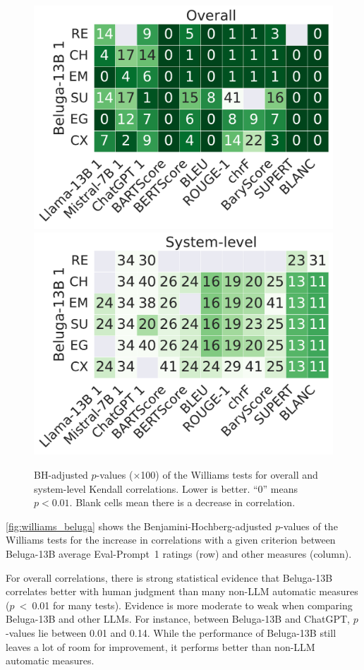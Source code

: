 \begin{figure}[!h]
    \centering
    \includegraphics[width=0.8\columnwidth]{pictures/llm_williams_kendall_story_bh.pdf}
    \includegraphics[width=0.8\columnwidth]{pictures/llm_williams_kendall_system_bh.pdf}
    \caption{BH-adjusted $p$-values ($\times$100) of the Williams tests for overall and system-level Kendall correlations. Lower is better. ``0'' means $p<0.01$. Blank cells mean there is a decrease in correlation.}
    \label{fig:williams_beluga}
\end{figure}

\autoref{fig:williams_beluga} shows the Benjamini-Hochberg-adjusted $p$-values of the Williams tests for the increase in correlations with a given criterion between Beluga-13B average Eval-Prompt~1 ratings (row) and other measures (column).

For overall correlations, there is strong statistical evidence that Beluga-13B correlates better with human judgment than many non-LLM automatic measures ($p$~<~0.01 for many tests). Evidence is more moderate to weak when comparing Beluga-13B and other LLMs. For instance, between Beluga-13B and ChatGPT, $p$-values lie between 0.01 and 0.14. While the performance of Beluga-13B still leaves a lot of room for improvement, it performs better than non-LLM automatic measures.

